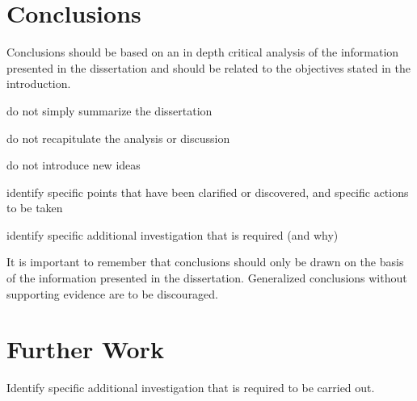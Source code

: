 \section{Conclusions}
Conclusions should be based on an in depth critical analysis of the information presented in the dissertation and should be related to the objectives stated in the introduction.

do not simply summarize the dissertation

do not recapitulate the analysis or discussion

do not introduce new ideas

identify specific points that have been clarified or discovered, and specific actions to be taken

identify specific additional investigation that is required (and why)

It is important to remember that conclusions should only be drawn on the basis of the information presented in the dissertation. Generalized conclusions without supporting evidence are to be
discouraged.

\section{Further Work}
Identify specific additional investigation that is required to be carried out.

